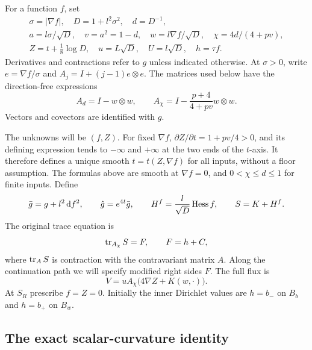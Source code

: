 For a function $f$, set
\begin{equation}\label{n3:deformation:basic-variables}
 \begin{gathered}
 \sigma=|\nabla f|,\quad D=1+l^2\sigma^2,\quad d=D^{-1},\\
 a=l\sigma/\sqrt D,\quad v=a^2=1-d,\quad
 w=l\nabla f/\sqrt D,\quad \chi=4d/(4+pv),\\
 Z=t+\tfrac18\log D,\quad u=L\sqrt D,\quad U=l\sqrt D,\quad h=\tau f.
 \end{gathered}
\end{equation}
Derivatives and contractions refer to $g$ unless indicated otherwise.
At $\sigma>0$, write $e=\nabla f/\sigma$ and
$A_j=I+(j-1)e\otimes e$. The matrices used below have the direction-free
expressions
\begin{equation}\label{n3:deformation:axial-matrices}
 A_d=I-w\otimes w,\qquad
 A_\chi=I-\frac{p+4}{4+pv}w\otimes w.
\end{equation}
Vectors and covectors are identified with $g$.

The unknowns will be $(f,Z)$. For fixed $\nabla f$,
$\partial Z/\partial t=1+pv/4>0$, and its defining expression tends to
$-\infty$ and $+\infty$ at the two ends of the $t$-axis. It therefore
defines a unique smooth $t=t(Z,\nabla f)$ for all inputs, without a floor
assumption. The formulas above are smooth at $\nabla f=0$, and
$0<\chi\le d\le1$ for finite inputs.
Define
\begin{equation}\label{n3:deformation:metrics}
 \bar g=g+l^2\,\mathrm d f^2,\qquad \hat g=e^{4t}\bar g,\qquad
 H^f=\frac l{\sqrt D}\operatorname{Hess} f,\qquad S=K+H^f.
\end{equation}
The original trace equation is
\begin{equation}\label{n3:deformation:trace}
 \operatorname{tr}_{A_\chi}S=F,\qquad F=h+C,
\end{equation}
where $\operatorname{tr}_A S$ is contraction with the contravariant matrix $A$.
Along the continuation path we will specify modified right sides $F$.
The full flux is
\begin{equation}\label{n3:deformation:flux}
 V=uA_\chi\bigl(4\nabla Z+K(w,\cdot)\bigr).
\end{equation}
At $S_R$ prescribe $f=Z=0$. Initially the inner Dirichlet values are
$h=b_-$ on $B_b$ and $h=b_+$ on $B_w$.

\subsection{The exact scalar-curvature identity}

